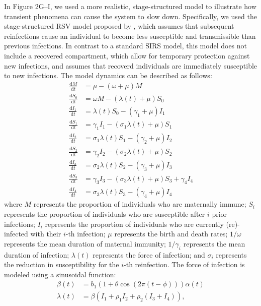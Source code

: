 \documentclass[12pt]{article}
\newcommand{\dd}[1]{\ensuremath{\, \mathrm{d}#1}}
\begin{document}
In Figure 2G--I, we used a more realistic, stage-structured model to illustrate how transient phenomena can cause the system to slow down.
Specifically, we used the stage-structured RSV model proposed by \citep{pitzer2015environmental}, which assumes that subsequent reinfections cause an individual to become less susceptible and transmissible than previous infections.
In contrast to a standard SIRS model, this model does not include a recovered compartment, which allow for temporary protection against new infections, and assumes that recoverd individuals are immediately susceptible to new infections.
The model dynamics can be described as follows:
\begin{align}
\frac{\dd M}{\dd t} &= \mu - (\omega + \mu) M\\
\frac{\dd S_0}{\dd t} &= \omega M - (\lambda(t) + \mu) S_0\\
\frac{\dd I_1}{\dd t} &= \lambda(t) S_0 - (\gamma_1 + \mu) I_1\\
\frac{\dd S_1}{\dd t} &= \gamma_1 I_1 - (\sigma_1 \lambda(t) + \mu) S_1\\
\frac{\dd I_2}{\dd t} &= \sigma_1 \lambda(t) S_1 - (\gamma_2 + \mu) I_2\\
\frac{\dd S_2}{\dd t} &= \gamma_2 I_2 - (\sigma_2 \lambda(t) + \mu) S_2\\
\frac{\dd I_3}{\dd t} &= \sigma_2 \lambda(t) S_2 - (\gamma_3 + \mu) I_3\\
\frac{\dd S_3}{\dd t} &= \gamma_3 I_3 - (\sigma_3 \lambda(t) + \mu) S_3 + \gamma_4 I_4\\
\frac{\dd I_4}{\dd t} &= \sigma_3 \lambda(t) S_3 - (\gamma_4 + \mu) I_4
\end{align}
where $M$ represents the proportion of individuals who are maternally immune;
$S_i$ represents the proportion of individuals who are susceptible after $i$ prior infections;
$I_i$ represents the proportion of individuals who are currently (re)-infected with their $i$-th infection;
$\mu$ represents the birth and death rates;
$1/\omega$ represents the mean duration of maternal immunity;
$1/\gamma_i$ represents the mean duration of infection;
$\lambda(t)$ represents the force of infection;
and $\sigma_i$ represents the reduction in susceptibility for the $i$-th reinfection.
The force of infection is modeled using a sinusoidal function:
\begin{align}
\beta(t) &= b_1 (1 + \theta \cos(2 \pi (t-\phi))) \alpha(t)\\
\lambda(t) &= \beta (I_1 + \rho_1 I_2 + \rho_2 (I_3 + I_4)), 
\end{align}
\end{document}
